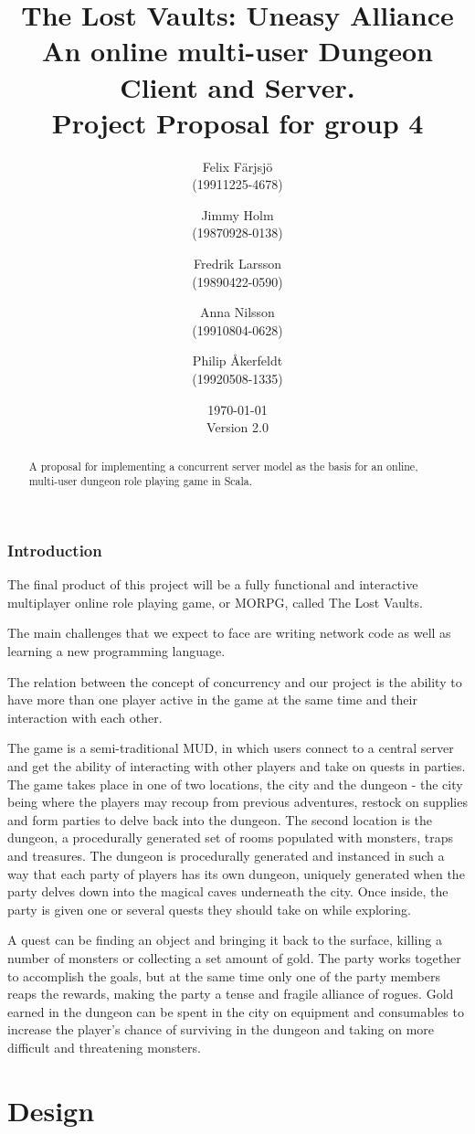 \documentclass[a4paper]{article}
\title{The Lost Vaults: Uneasy Alliance\\\small{An online multi-user Dungeon Client and Server.}\\\small{Project Proposal for group 4}}
\author{Felix Färjsjö\\(19911225-4678) \and Jimmy Holm\\(19870928-0138) \and Fredrik Larsson\\(19890422-0590) \and Anna Nilsson\\(19910804-0628) \and Philip Åkerfeldt\\(19920508-1335)}
\date{\today\\Version 2.0}
\begin{document}
\maketitle
\newpage
\begin{abstract}
A proposal for implementing a concurrent server model as the basis for an online, multi-user dungeon role playing game in Scala.
\end{abstract}

\tableofcontents
\listoffigures
\newpage
\section{Introduction}
The final product of this project will be a fully functional and interactive multiplayer online role playing game, or MORPG, called The Lost Vaults.

The main challenges that we expect to face are writing network code as well as learning a new programming language.

The relation between the concept of concurrency and our project is the ability to have more than one player active in the game at the same time and their interaction with each other.

The game is a semi-traditional MUD, in which users connect to a central server and get the ability of interacting with other players and take on quests in parties. The game takes place in one of two locations, the city and the dungeon - the city being where the players may recoup from previous adventures, restock on supplies and form parties to delve back into the dungeon. The second location is the dungeon, a procedurally generated set of rooms populated with monsters, traps and treasures. The dungeon is procedurally generated and instanced in such a way that each party of players has its own dungeon, uniquely generated when the party delves down into the magical caves underneath the city. Once inside, the party is given one or several quests they should take on while exploring. 

A quest can be finding an object and bringing it back to the surface, killing a number of monsters or collecting a set amount of gold. The party works together to accomplish the goals, but at the same time only one of the party members reaps the rewards, making the party a tense and fragile alliance of rogues. Gold earned in the dungeon can be spent in the city on equipment and consumables to increase the player’s chance of surviving in the dungeon and taking on more difficult and threatening monsters.
\part{Design}
\end{document}
